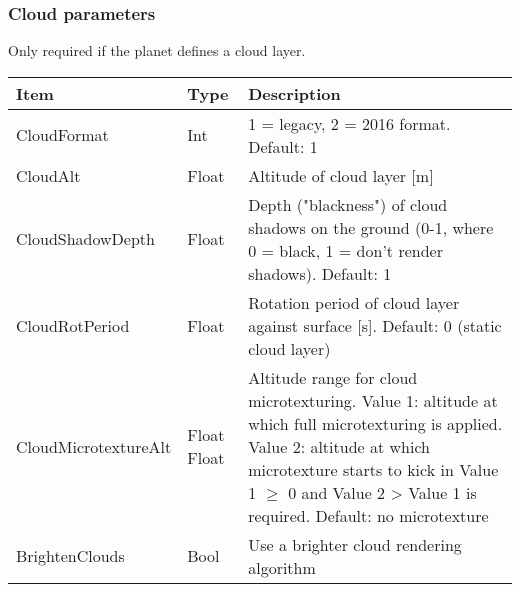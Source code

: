 \documentclass[Orbiter Developer Manual.tex]{subfiles}
\begin{document}


\subsubsection*{Cloud parameters}
Only required if the planet defines a cloud layer.

	\begin{longtable}{ |p{}|p{}|p{}| }
	\hline\rule{0pt}{2ex}
	\textbf{Item} & \textbf{Type} & \textbf{Description}\\
	\hline\rule{0pt}{2ex}
	CloudFormat & Int & 1 = legacy, 2 = 2016 format. Default: 1\\
	\hline\rule{0pt}{2ex}
	CloudAlt & Float & Altitude of cloud layer [m]\\
	\hline\rule{0pt}{2ex}
	CloudShadowDepth & Float & Depth ("blackness") of cloud shadows on the ground (0-1, where 0 = black, 1 = don't render shadows). Default: 1\\
	\hline\rule{0pt}{2ex}
	CloudRotPeriod & Float & Rotation period of cloud layer against surface [s]. Default: 0 (static cloud layer)\\
	\hline\rule{0pt}{2ex}
	CloudMicrotextureAlt & Float Float & Altitude range for cloud microtexturing.\newline
	Value 1: altitude at which full microtexturing is applied.\newline
	Value 2: altitude at which microtexture starts to kick in\newline
	Value 1 $\geq$ 0 and Value 2 > Value 1 is required. Default: no microtexture\\
	\hline\rule{0pt}{2ex}
	BrightenClouds & Bool & Use a brighter cloud rendering algorithm\\
	\hline
	\end{longtable}
\end{document}
